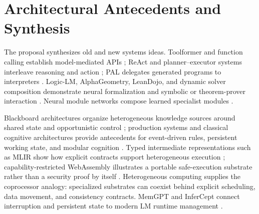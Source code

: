 \documentclass[11pt]{article}
\begin{document}
\section{Architectural Antecedents and Synthesis}

The proposal synthesizes old and new systems ideas.  Toolformer and function
calling establish model-mediated APIs \cite{toolformer}; ReAct and
planner--executor systems interleave reasoning and action \cite{react}; PAL
delegates generated programs to interpreters \cite{pal}.  Logic-LM,
AlphaGeometry, LeanDojo, and dynamic solver composition demonstrate neural
formalization and symbolic or theorem-prover interaction
\cite{logiclm,alphageometry,leandojo,dynamic}.  Neural module networks compose
learned specialist modules \cite{nmn}.

Blackboard architectures organize heterogeneous knowledge sources around shared
state and opportunistic control \cite{blackboard}; production systems and
classical cognitive architectures provide antecedents for event-driven rules,
persistent working state, and modular cognition \cite{rete,soar,actr}.  Typed
intermediate representations such as MLIR show how explicit contracts support
heterogeneous execution \cite{mlir}; capability-restricted WebAssembly
illustrates a portable safe-execution substrate rather than a security proof by
itself \cite{wasm}.  Heterogeneous computing supplies the coprocessor analogy:
specialized substrates can coexist behind explicit scheduling, data movement,
and consistency contracts.  MemGPT and InferCept connect interruption and
persistent state to modern LM runtime management \cite{memgpt,infercept}.
\end{document}
